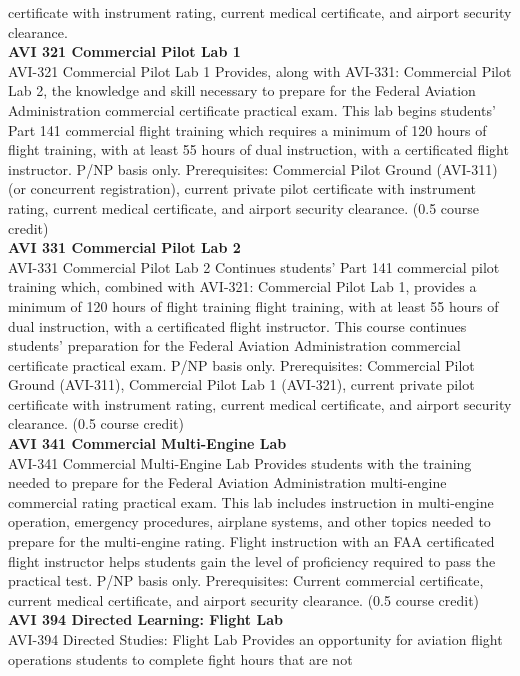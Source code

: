 \documentclass[
  letterpaper,
]{scrbook}
\begin{document}
certificate with instrument rating, current medical certificate, and
airport security clearance.\\
\textbf{AVI 321 Commercial Pilot Lab 1}\\
AVI-321 Commercial Pilot Lab 1 Provides, along with AVI-331: Commercial
Pilot Lab 2, the knowledge and skill necessary to prepare for the
Federal Aviation Administration commercial certificate practical exam.
This lab begins students' Part 141 commercial flight training which
requires a minimum of 120 hours of flight training, with at least 55
hours of dual instruction, with a certificated flight instructor. P/NP
basis only. Prerequisites: Commercial Pilot Ground (AVI-311) (or
concurrent registration), current private pilot certificate with
instrument rating, current medical certificate, and airport security
clearance. (0.5 course credit)\\
\textbf{AVI 331 Commercial Pilot Lab 2}\\
AVI-331 Commercial Pilot Lab 2 Continues students' Part 141 commercial
pilot training which, combined with AVI-321: Commercial Pilot Lab 1,
provides a minimum of 120 hours of flight training flight training, with
at least 55 hours of dual instruction, with a certificated flight
instructor. This course continues students' preparation for the Federal
Aviation Administration commercial certificate practical exam. P/NP
basis only. Prerequisites: Commercial Pilot Ground (AVI-311), Commercial
Pilot Lab 1 (AVI-321), current private pilot certificate with instrument
rating, current medical certificate, and airport security clearance.
(0.5 course credit)\\
\textbf{AVI 341 Commercial Multi-Engine Lab}\\
AVI-341 Commercial Multi-Engine Lab Provides students with the training
needed to prepare for the Federal Aviation Administration multi-engine
commercial rating practical exam. This lab includes instruction in
multi-engine operation, emergency procedures, airplane systems, and
other topics needed to prepare for the multi-engine rating. Flight
instruction with an FAA certificated flight instructor helps students
gain the level of proficiency required to pass the practical test. P/NP
basis only. Prerequisites: Current commercial certificate, current
medical certificate, and airport security clearance. (0.5 course
credit)\\
\textbf{AVI 394 Directed Learning: Flight Lab}\\
AVI-394 Directed Studies: Flight Lab Provides an opportunity for
aviation flight operations students to complete fight hours that are not
\end{document}
